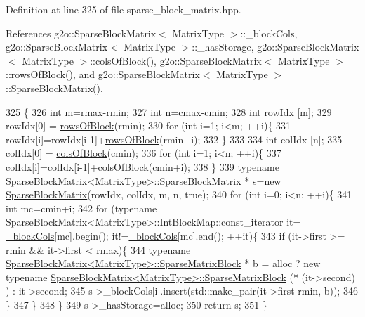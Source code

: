 Definition at line 325 of file sparse\+\_\+block\+\_\+matrix.\+hpp.



References g2o\+::\+Sparse\+Block\+Matrix$<$ Matrix\+Type $>$\+::\+\_\+block\+Cols, g2o\+::\+Sparse\+Block\+Matrix$<$ Matrix\+Type $>$\+::\+\_\+has\+Storage, g2o\+::\+Sparse\+Block\+Matrix$<$ Matrix\+Type $>$\+::cols\+Of\+Block(), g2o\+::\+Sparse\+Block\+Matrix$<$ Matrix\+Type $>$\+::rows\+Of\+Block(), and g2o\+::\+Sparse\+Block\+Matrix$<$ Matrix\+Type $>$\+::\+Sparse\+Block\+Matrix().


\begin{DoxyCode}
325                                                                                                            
                          \{
326     \textcolor{keywordtype}{int} m=rmax-rmin;
327     \textcolor{keywordtype}{int} n=cmax-cmin;
328     \textcolor{keywordtype}{int} rowIdx [m];
329     rowIdx[0] = \hyperlink{classg2o_1_1SparseBlockMatrix_a2f1eceae58978d7ee263a80961006d22}{rowsOfBlock}(rmin);
330     \textcolor{keywordflow}{for} (\textcolor{keywordtype}{int} i=1; i<m; ++i)\{
331       rowIdx[i]=rowIdx[i-1]+\hyperlink{classg2o_1_1SparseBlockMatrix_a2f1eceae58978d7ee263a80961006d22}{rowsOfBlock}(rmin+i);
332     \}
333 
334     \textcolor{keywordtype}{int} colIdx [n];
335     colIdx[0] = \hyperlink{classg2o_1_1SparseBlockMatrix_adb88ef292aedf1468f57cf5dc751a8e2}{colsOfBlock}(cmin);
336     \textcolor{keywordflow}{for} (\textcolor{keywordtype}{int} i=1; i<n; ++i)\{
337       colIdx[i]=colIdx[i-1]+\hyperlink{classg2o_1_1SparseBlockMatrix_adb88ef292aedf1468f57cf5dc751a8e2}{colsOfBlock}(cmin+i);
338     \}
339     \textcolor{keyword}{typename} \hyperlink{classg2o_1_1SparseBlockMatrix_af9b8a9cb09a88bc444775a9974db8760}{SparseBlockMatrix<MatrixType>::SparseBlockMatrix}
      * s=\textcolor{keyword}{new} \hyperlink{classg2o_1_1SparseBlockMatrix_af9b8a9cb09a88bc444775a9974db8760}{SparseBlockMatrix}(rowIdx, colIdx, m, n, \textcolor{keyword}{true});
340     \textcolor{keywordflow}{for} (\textcolor{keywordtype}{int} i=0; i<n; ++i)\{
341       \textcolor{keywordtype}{int} mc=cmin+i;
342       \textcolor{keywordflow}{for} (\textcolor{keyword}{typename} SparseBlockMatrix<MatrixType>::IntBlockMap::const\_iterator it=
      \hyperlink{classg2o_1_1SparseBlockMatrix_ae236d56a01ba4d292450a518621b41f8}{\_blockCols}[mc].begin(); it!=\hyperlink{classg2o_1_1SparseBlockMatrix_ae236d56a01ba4d292450a518621b41f8}{\_blockCols}[mc].end(); ++it)\{
343         \textcolor{keywordflow}{if} (it->first >= rmin && it->first < rmax)\{
344           \textcolor{keyword}{typename} \hyperlink{classg2o_1_1SparseBlockMatrix_ab2f7376cbf055803fda6527dcc43e3be}{SparseBlockMatrix<MatrixType>::SparseMatrixBlock}
      * b = alloc ? \textcolor{keyword}{new} \textcolor{keyword}{typename} \hyperlink{classg2o_1_1SparseBlockMatrix_ab2f7376cbf055803fda6527dcc43e3be}{SparseBlockMatrix<MatrixType>::SparseMatrixBlock}
       (* (it->second) ) : it->second;
345           s->\_blockCols[i].insert(std::make\_pair(it->first-rmin, b));
346         \}
347       \}
348     \}
349     s->\_hasStorage=alloc;
350     \textcolor{keywordflow}{return} s;
351   \}
\end{DoxyCode}
